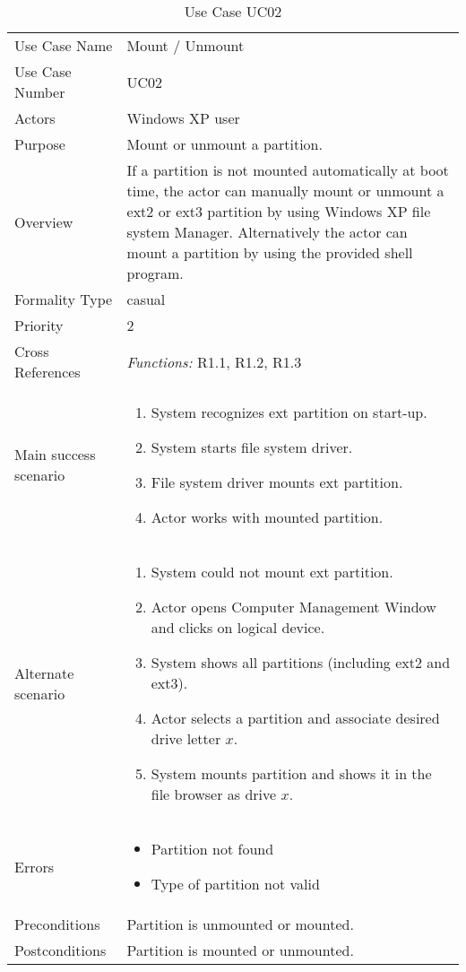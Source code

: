 \begin{longtable}{|p{4cm} X|}
\caption{\label{tab:useCase02}Use Case UC02}\\
\hline
Use Case Name 					&Mount / Unmount\\
Use Case Number					&UC02\\
Actors							&Windows XP user\\
Purpose							&Mount or unmount a partition.\\
Overview						&If a partition is not mounted automatically at boot time, the actor can manually mount or unmount a ext2 or ext3 partition by using Windows XP file system Manager. Alternatively the actor can mount a partition by using the provided shell program.\\
Formality Type							&casual\\
Priority						&2\\
Cross References				&\textit{Functions:} R1.1, R1.2, R1.3\\ 
Main success scenario		&
\begin{enumerate}
\item System recognizes ext partition on start-up.
\item	System starts file system driver.
\item File system driver mounts ext partition.
\item Actor works with mounted partition.
\end{enumerate}
\\
Alternate scenario				&
\begin{enumerate}
\item	System could not mount ext partition.
\item Actor opens Computer Management Window and clicks on logical device.
\item System shows all partitions (including ext2 and ext3).
\item Actor selects a partition and associate desired drive letter $x$.
\item System mounts partition and shows it in the file browser as drive $x$.
\end{enumerate}
\\
Errors							&\begin{itemize}
								 \item Partition not found
								 \item Type of partition not valid
								 \end{itemize}\\
Preconditions					&Partition is unmounted or mounted.\\
Postconditions					&Partition is mounted or unmounted.\\
\hline
\end{longtable}
